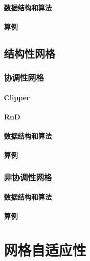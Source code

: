 \subsubsection{数据结构和算法}

\subsubsection{算例}

\section{结构性网格}

\subsection{协调性网格}

\subsubsection{Clipper}

\subsubsection{RnD}

\subsubsection{数据结构和算法}

\subsubsection{算例}

\subsection{非协调性网格}

\subsubsection{数据结构和算法}

\subsubsection{算例}

\chapter{网格自适应性}


